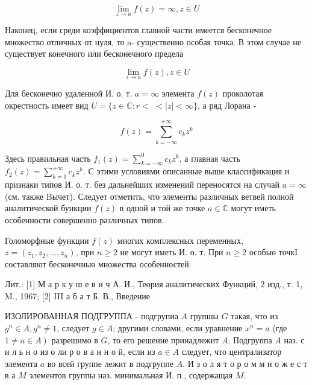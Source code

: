 \documentclass[10pt]{article}
\begin{document}
\[

\lim _{z \rightarrow a} f(z)=\infty, z \in U

\]



Наконец, если среди коэффициентов главной части имеется бесконечное множество отличных от нуля, то a- существенно особая точка. В этом случае не существует конечного или бесконечного предела



\[

\lim _{z \rightarrow a} f(z), z \in U

\]



Для бесконечно удаленной И. о. т. $a=\infty$ элемента $f(z)$ проколотая окрестность имеет вид $U=\{z \in \mathbb{C}: r<$ $<|z|<\infty\}$, а ряд Лорана -



\[

f(z)=\sum_{k=-\infty}^{+\infty} c_{k} z^{k}

\]



Здесь правильная часть $f_{1}(z)=\sum_{k=-\infty}^{0} c_{k} z^{k}$, а главная часть $f_{2}(z)=\sum_{k=1}^{+\infty} c_{k} z^{k}$. С этими условиями описанные выше классификация и признаки типов И. о. т. без дальнейших изменений переносятся на случай $a=\infty$ (см. также Bычет). Следует отметить, что элементы различных ветвей полной аналитической бункции $f(z)$ в одной и той же точке $a \in \mathbb{C}$ могут иметь особенности совершенно различных типов.



Голоморфные функции $f(z)$ многих комплексных переменных,$z=\left(z_{1}, z_{2}, \ldots, z_{n}\right)$, при $n \geqslant 2$ не могут иметь И. о. т. При $n \geqslant 2$ особыө точкІ составляют бесконечныө множества особенностей.



Лит.: [1] М а р к у ш е в и ч А. И., Теория аналитических Функций, 2 изд., т. 1, M., 1967; [2] III а б а т Б. В., Введение



ИЗОЛИРОВАННАЯ ПОДГРУППА - подгрупиа $A$ групшы $G$ такая, что из $g^{n} \in A, g^{n} \neq 1$, следует $g \in A$; другими словами, если уравнение $x^{n}=a$ (где $\left.1 \neq a \in A\right)$ разрешимо в $G$, то его решение принадлежит $A$. Подгруппа $A$ наз. с и л ь н о из о ли р о в а н н о й, если из $a \in A$ следует, что централизатор элемента $a$ во всей группе лежит в подгруппе $A$. И з о л я т о р о м м н о ж е с т в а $M$ элементов группы наз. минимальная И. п., содержащая $M$.
\end{document}
